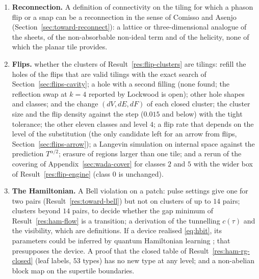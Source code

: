 \documentclass[11pt]{article}
\theoremstyle{definition}
\begin{document}
\begin{enumerate}[leftmargin=1.6em,itemsep=1pt]
\item\label{item:reconnect} \textbf{Reconnection.} A definition of connectivity on the tiling for which a phason flip or a snap can be a reconnection in the sense of Comisso and Asenjo \cite{comisso2026} (Section~\ref{sec:toward-reconnect}): a lattice or three-dimensional analogue of the sheets, of the non-absorbable non-ideal term and of the helicity, none of which the planar tile provides.
\item\label{item:flips} \textbf{Flips.} whether the clusters of Result~\ref{res:flip-clusters} are tilings: refill the holes of the flips that are valid tilings with the exact search of Section~\ref{sec:flips-cavity}; a hole with a second filling (none found; the reflection swap at $k=4$ reported by Lockwood is open); other hole shapes and classes; and the change $(dV,dE,dF)$ of each closed cluster; the cluster size and the flip density against the step ($0.015$ and below) with the tight tolerance; the other eleven classes and level $4$; a flip rate that depends on the level of the substitution (the only candidate left for an arrow from flips, Section~\ref{sec:flips-arrow}); a Langevin simulation on internal space against the prediction $T^{\alpha/2}$; erasure of regions larger than one tile; and a rerun of the covering of Appendix~\ref{sec:wada-cover} for classes $2$ and $5$ with the wider box of Result~\ref{res:flip-engine} (class $0$ is unchanged).
\item\label{item:ham} \textbf{The Hamiltonian.} A Bell violation on a patch: pulse settings give one for two pairs (Result~\ref{res:toward-bell}) but not on clusters of up to $14$ pairs; clusters beyond $14$ pairs, to decide whether the gap minimum of Result~\ref{res:ham-flow} is a transition; a derivation of the tunnelling $c(\tau)$ and the visibility, which are definitions. If a device realised \eqref{eq:hbit}, its parameters could be inferred by quantum Hamiltonian learning \cite{wiebe2014}; that presupposes the device. A proof that the closed table of Result~\ref{res:ham-rg-closed} (leaf labels, $53$ types) has no new type at any level; and a non-abelian block map on the supertile boundaries.
\end{enumerate}


\end{document}
